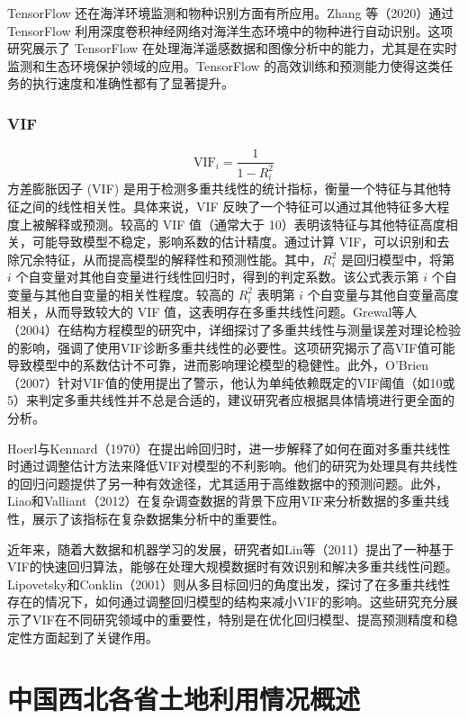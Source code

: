 \documentclass[AutoFakeBold]{LZUThesis-PgD&PhD}
\begin{document}
	TensorFlow 还在海洋环境监测和物种识别方面有所应用。Zhang 等（2020）通过 TensorFlow 利用深度卷积神经网络对海洋生态环境中的物种进行自动识别\cite{zhang2020}。这项研究展示了 TensorFlow 在处理海洋遥感数据和图像分析中的能力，尤其是在实时监测和生态环境保护领域的应用。TensorFlow 的高效训练和预测能力使得这类任务的执行速度和准确性都有了显著提升。
	

	\subsection{VIF}
	
	\[
	\text{VIF}_i = \frac{1}{1 - R_i^2}
	\]
	方差膨胀因子 (VIF) 是用于检测多重共线性的统计指标，衡量一个特征与其他特征之间的线性相关性。具体来说，VIF 反映了一个特征可以通过其他特征多大程度上被解释或预测。较高的 VIF 值（通常大于 10）表明该特征与其他特征高度相关，可能导致模型不稳定，影响系数的估计精度。通过计算 VIF，可以识别和去除冗余特征，从而提高模型的解释性和预测性能。其中，$R_i^2$ 是回归模型中，将第 $i$ 个自变量对其他自变量进行线性回归时，得到的判定系数。该公式表示第 $i$ 个自变量与其他自变量的相关性程度。较高的 $R_i^2$ 表明第 $i$ 个自变量与其他自变量高度相关，从而导致较大的 VIF 值，这表明存在多重共线性问题。Grewal等人（2004）在结构方程模型的研究中，详细探讨了多重共线性与测量误差对理论检验的影响，强调了使用VIF诊断多重共线性的必要性\cite{grewal2004}。这项研究揭示了高VIF值可能导致模型中的系数估计不可靠，进而影响理论模型的稳健性。此外，O’Brien（2007）针对VIF值的使用提出了警示，他认为单纯依赖既定的VIF阈值（如10或5）来判定多重共线性并不总是合适的，建议研究者应根据具体情境进行更全面的分析\cite{obrien2007}。
	
	Hoerl与Kennard（1970）在提出岭回归时，进一步解释了如何在面对多重共线性时通过调整估计方法来降低VIF对模型的不利影响\cite{hoerl1970}。他们的研究为处理具有共线性的回归问题提供了另一种有效途径，尤其适用于高维数据中的预测问题。此外，Liao和Valliant（2012）在复杂调查数据的背景下应用VIF来分析数据的多重共线性，展示了该指标在复杂数据集分析中的重要性\cite{liao2012}。
	
	近年来，随着大数据和机器学习的发展，研究者如Lin等（2011）提出了一种基于VIF的快速回归算法，能够在处理大规模数据时有效识别和解决多重共线性问题\cite{lin2011}。Lipovetsky和Conklin（2001）则从多目标回归的角度出发，探讨了在多重共线性存在的情况下，如何通过调整回归模型的结构来减小VIF的影响\cite{lipovetsky2001}。这些研究充分展示了VIF在不同研究领域中的重要性，特别是在优化回归模型、提高预测精度和稳定性方面起到了关键作用。
	

\chapter{中国西北各省土地利用情况概述}
\end{document}
